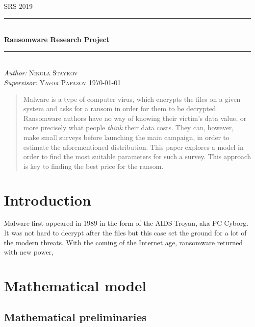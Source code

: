 \documentclass[11pt, a4paper]{article}
\begin{document}
\begin{titlepage}
	\newcommand{\HRule}{\rule{\linewidth}{0.5mm}}
	\centering
	\textsc{\LARGE SRS 2019}\\[1cm]
	\HRule\\[1 cm]
	
	{\huge\bfseries Ransomware Research Project }\\[0.5 cm] 
	\HRule\\
    \vfill
			\Large
			\textit{Author:}
			 \textsc{Nikola Staykov}\\
             \vspace{2cm}
			\Large
			\textit{Supervisor:}
            \textsc{Yavor Papazov}
    \vfill	
	{\large\today}   
	\vfill
\end{titlepage}

\tableofcontents
\newpage
\begin{abstract}
		Malware is a type of computer virus, which encrypts the files on a given system and asks for a ransom in order for them to be decrypted. Ransomware authors have no way of knowing their victim's data value, or more precisely what people \textit{think} their data costs. They can, however, make small surveys before launching the main campaign, in order to estimate the aforementioned distribution. This paper explores a model in order to find the most suitable parameters for such a survey. This approach is key to finding the best price for the ransom.
\end{abstract}

\section{Introduction}
		Malware first appeared in 1989 in the form of the AIDS Troyan, aka PC Cyborg. It was not hard to decrypt after the files but this case set the ground for a lot of the modern threats. With the coming of the Internet age, ransomware returned with new power, 
\newpage
\section{Mathematical model}
	\subsection{Mathematical preliminaries}
\end{document}
